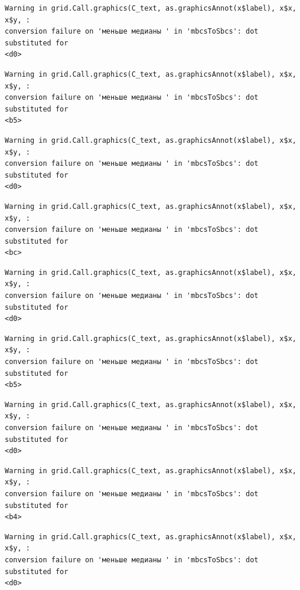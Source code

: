 \documentclass[
  letterpaper,
  DIV=11,
  numbers=noendperiod]{scrreprt}
\theoremstyle{definition}
\theoremstyle{remark}
\begin{document}
\begin{verbatim}
Warning in grid.Call.graphics(C_text, as.graphicsAnnot(x$label), x$x, x$y, :
conversion failure on 'меньше медианы ' in 'mbcsToSbcs': dot substituted for
<d0>
\end{verbatim}

\begin{verbatim}
Warning in grid.Call.graphics(C_text, as.graphicsAnnot(x$label), x$x, x$y, :
conversion failure on 'меньше медианы ' in 'mbcsToSbcs': dot substituted for
<b5>
\end{verbatim}

\begin{verbatim}
Warning in grid.Call.graphics(C_text, as.graphicsAnnot(x$label), x$x, x$y, :
conversion failure on 'меньше медианы ' in 'mbcsToSbcs': dot substituted for
<d0>
\end{verbatim}

\begin{verbatim}
Warning in grid.Call.graphics(C_text, as.graphicsAnnot(x$label), x$x, x$y, :
conversion failure on 'меньше медианы ' in 'mbcsToSbcs': dot substituted for
<bc>
\end{verbatim}

\begin{verbatim}
Warning in grid.Call.graphics(C_text, as.graphicsAnnot(x$label), x$x, x$y, :
conversion failure on 'меньше медианы ' in 'mbcsToSbcs': dot substituted for
<d0>
\end{verbatim}

\begin{verbatim}
Warning in grid.Call.graphics(C_text, as.graphicsAnnot(x$label), x$x, x$y, :
conversion failure on 'меньше медианы ' in 'mbcsToSbcs': dot substituted for
<b5>
\end{verbatim}

\begin{verbatim}
Warning in grid.Call.graphics(C_text, as.graphicsAnnot(x$label), x$x, x$y, :
conversion failure on 'меньше медианы ' in 'mbcsToSbcs': dot substituted for
<d0>
\end{verbatim}

\begin{verbatim}
Warning in grid.Call.graphics(C_text, as.graphicsAnnot(x$label), x$x, x$y, :
conversion failure on 'меньше медианы ' in 'mbcsToSbcs': dot substituted for
<b4>
\end{verbatim}

\begin{verbatim}
Warning in grid.Call.graphics(C_text, as.graphicsAnnot(x$label), x$x, x$y, :
conversion failure on 'меньше медианы ' in 'mbcsToSbcs': dot substituted for
<d0>
\end{verbatim}
\end{document}
